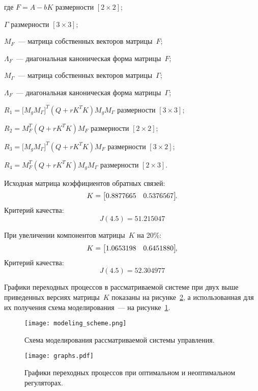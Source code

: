 \begin{ESKDexplanation}
	\item[где ] $F = A - b K$ размерности $[2 \times 2]$;
	\item $\Gamma$ размерности $[3 \times 3]$;
	\item $M_F$~--- матрица собственных векторов матрицы~$F$;
	\item $\Lambda_F$~--- диагональная каноническая форма матрицы~$F$;
	\item $M_\Gamma$~--- матрица собственных векторов матрицы~$\Gamma$;
	\item $\Lambda_F$~--- диагональная каноническая форма матрицы~$\Gamma$;	
	\item $R_1 = \bigl[ M_g M_\Gamma \bigl]^T ( Q + r K^T K ) M_g M_\Gamma$ размерности $[3 \times 3]$;
	\item $R_2 = M_F^T ( Q + r K^T K ) M_F$  размерности $[2 \times 2]$;
	\item $R_3 = \bigl[ M_g M_\Gamma \bigl]^T ( Q + r K^T K ) M_F$ размерности $[3 \times 2]$;
	\item $R_4 = M_F^T ( Q + r K^T K ) M_g M_\Gamma$ размерности $[2 \times 3]$.
\end{ESKDexplanation}

Исходная матрица коэффициентов обратных связей:
\begin{equation}
    K = \begin{bmatrix}0.8877665&0.5376567\cr \end{bmatrix}\!\!\ldotp
\end{equation}
Критерий качества:
\begin{equation}
	J(4.5) = 51.215047
\end{equation}

При увеличении компонентов матрицы~$K$ на 20\%:
\begin{equation}
    K = \begin{bmatrix}1.0653198&0.6451880\cr \end{bmatrix}\!\!,
\end{equation}
Критерий качества:
\begin{equation}
	J(4.5) = 52.304977
\end{equation}


Графики переходных процессов в рассматриваемой системе при двух выше приведенных версиях матрицы~$K$ показаны на рисунке~\ref{img_graphs},
а использованная для их получения схема моделирования~--- на рисунке~\ref{img_modeling_scheme}.
\begin{figure}[h!]
	\centering
	\texttt{[image: modeling\_scheme.png]}
	\vspace{0.5cm}
	\caption{Схема моделирования рассматриваемой системы управления.}
	\label{img_modeling_scheme}
\end{figure}
\begin{figure}[h!]
    \centering
    \texttt{[image: graphs.pdf]}
    \vspace{0cm}
    \caption{Графики переходных процессов при оптимальном и неоптимальном регуляторах.}
    \label{img_graphs}
\end{figure}

